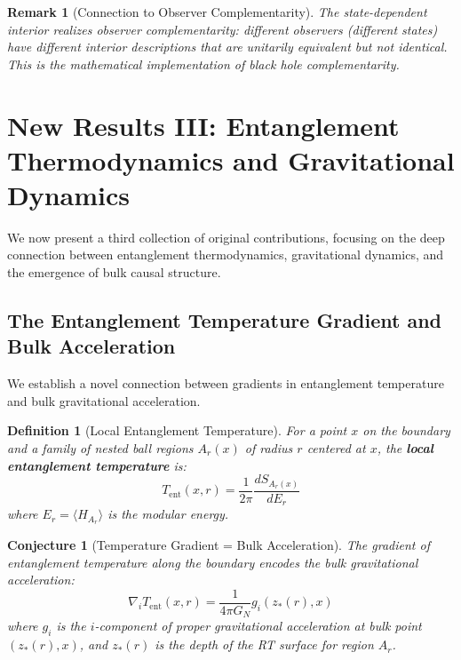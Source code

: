 \documentclass[12pt,a4paper]{article}
\newtheorem{conjecture}[theorem]{Conjecture}
\newtheorem{definition}[theorem]{Definition}
\newtheorem*{remark}{Remark}
\begin{document}
\begin{remark}[Connection to Observer Complementarity]
The state-dependent interior realizes \emph{observer complementarity}: different observers (different states) have different interior descriptions that are unitarily equivalent but not identical. This is the mathematical implementation of black hole complementarity.
\end{remark}

\section{New Results III: Entanglement Thermodynamics and Gravitational Dynamics}

We now present a third collection of original contributions, focusing on the deep connection between entanglement thermodynamics, gravitational dynamics, and the emergence of bulk causal structure.

\subsection{The Entanglement Temperature Gradient and Bulk Acceleration}

We establish a novel connection between gradients in entanglement temperature and bulk gravitational acceleration.

\begin{definition}[Local Entanglement Temperature]
For a point $x$ on the boundary and a family of nested ball regions $A_r(x)$ of radius $r$ centered at $x$, the \textbf{local entanglement temperature} is:
\begin{equation}
T_{\text{ent}}(x, r) = \frac{1}{2\pi} \frac{dS_{A_r(x)}}{dE_r}
\end{equation}
where $E_r = \langle H_{A_r} \rangle$ is the modular energy.
\end{definition}

\begin{conjecture}[Temperature Gradient = Bulk Acceleration]
The gradient of entanglement temperature along the boundary encodes the bulk gravitational acceleration:
\begin{equation}
\nabla_i T_{\text{ent}}(x, r) = \frac{1}{4\pi G_N} g_i(z_*(r), x)
\end{equation}
where $g_i$ is the $i$-component of proper gravitational acceleration at bulk point $(z_*(r), x)$, and $z_*(r)$ is the depth of the RT surface for region $A_r$.
\end{conjecture}
\end{document}
